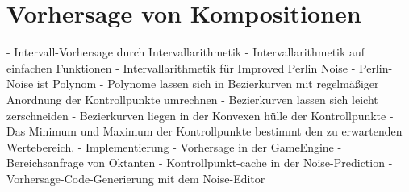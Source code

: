 \chapter{Vorhersage von Kompositionen}
	- Intervall-Vorhersage durch Intervallarithmetik
		- Intervallarithmetik auf einfachen Funktionen
		- Intervallarithmetik für Improved Perlin Noise
			- Perlin-Noise ist Polynom
			- Polynome lassen sich in Bezierkurven mit regelmäßiger Anordnung der Kontrollpunkte umrechnen
			- Bezierkurven lassen sich leicht zerschneiden
			- Bezierkurven liegen in der Konvexen hülle der Kontrollpunkte
			- Das Minimum und Maximum der Kontrollpunkte bestimmt den zu erwartenden Wertebereich.
			- Implementierung
		- Vorhersage in der GameEngine
			- Bereichsanfrage von Oktanten
			- Kontrollpunkt-cache in der Noise-Prediction
			- Vorhersage-Code-Generierung mit dem Noise-Editor
